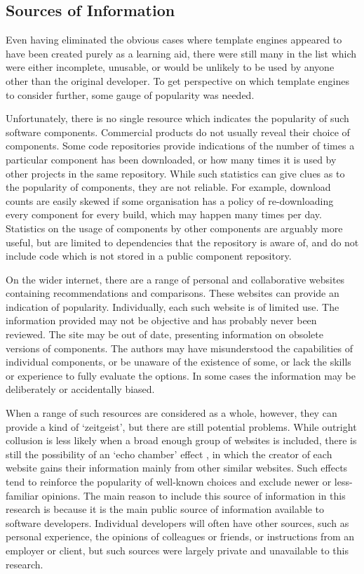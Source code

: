 \subsection{Sources of Information}

Even having eliminated the obvious cases where template engines appeared to have been created purely as a learning aid, there were still many in the list which were either incomplete, unusable, or would be unlikely to be used by anyone other than the original developer. To get perspective on which template engines to consider further, some gauge of popularity was needed.

Unfortunately, there is no single resource which indicates the popularity of such software components. Commercial products do not usually reveal their choice of components. Some code repositories provide indications of the number of times a particular component has been downloaded, or how many times it is used by other projects in the same repository. While such statistics can give clues as to the popularity of components, they are not reliable. For example, download counts are easily skewed if some organisation has a policy of re-downloading every component for every build, which may happen many times per day. Statistics on the usage of components by other components are arguably more useful, but are limited to dependencies that the repository is aware of, and do not include code which is not stored in a public component repository.

On the wider internet, there are a range of personal and collaborative websites containing recommendations and comparisons. These websites can provide an indication of popularity. Individually, each such website is of limited use. The information provided may not be objective and has probably never been reviewed. The site may be out of date, presenting information on obsolete versions of components. The authors may have misunderstood the capabilities of individual components, or be unaware of the existence of some, or lack the skills or experience to fully evaluate the options. In some cases the information may be deliberately or accidentally biased.

When a range of such resources are considered as a whole, however, they can provide a kind of `zeitgeist', but there are still potential problems. While outright collusion is less likely when a broad enough group of websites is included, there is still the possibility of an `echo chamber' effect \citep{Cinelli2021}, in which the creator of each website gains their information mainly from other similar websites. Such effects tend to reinforce the popularity of well-known choices and exclude newer or less-familiar opinions. The main reason to include this source of information in this research is because it is the main public source of information available to software developers. Individual developers will often have other sources, such as personal experience, the opinions of colleagues or friends, or instructions from an employer or client, but such sources were largely private and unavailable to this research.

